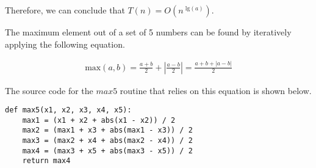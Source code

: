 \documentclass[11pt]{article}
\newcommand{\tlg}{\text{ lg}}
\begin{document}
\begin{sol}
Therefore, we can conclude that $T(n) = O(n^{\tlg(a)})$.

\end{sol}

\begin{prob}{5}
\end{prob}
\begin{sol} 

The maximum element out of a set of 5 numbers can be found by iteratively applying the following equation.

\begin{eqnarray*}
\text{max}(a,b) = \frac{a+b}{2} + |\frac{a-b}{2}| = \frac{a + b + |a - b|}{2}
\end{eqnarray*}

The source code for the $max5$ routine that relies on this equation is shown below.

\begin{lstlisting}
def max5(x1, x2, x3, x4, x5):
	max1 = (x1 + x2 + abs(x1 - x2)) / 2
	max2 = (max1 + x3 + abs(max1 - x3)) / 2
	max3 = (max2 + x4 + abs(max2 - x4)) / 2
	max4 = (max3 + x5 + abs(max3 - x5)) / 2
	return max4
\end{lstlisting}

\end{sol}

\end{document}
